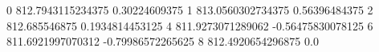 0 812.7943115234375 0.30224609375
1 813.0560302734375 0.56396484375
2 812.685546875 0.1934814453125
4 811.9273071289062 -0.56475830078125
6 811.6921997070312 -0.79986572265625
8 812.4920654296875 0.0
